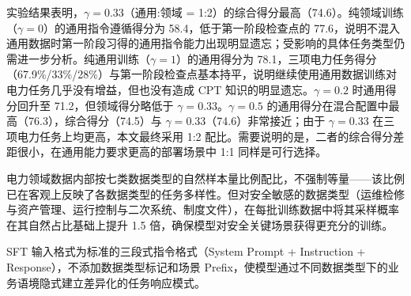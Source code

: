 \documentclass[fontset=fandol,type=master,campus=shenzhen,etitleauto=true]{hithesisbook}
\begin{document}
\begin{table}[htbp]
\centering
\caption{SFT第二阶段通用-领域数据配比实验结果}
\label{tab:sft-ratio}
\small
\setlength{\tabcolsep}{4pt}
\end{table}

实验结果表明，$\gamma = 0.33$（通用:领域 = 1:2）的综合得分最高（74.6）。纯领域训练（$\gamma = 0$）的通用指令遵循得分为 58.4，低于第一阶段检查点的 77.6，说明不混入通用数据时第一阶段习得的通用指令能力出现明显遗忘；受影响的具体任务类型仍需进一步分析。纯通用训练（$\gamma = 1$）的通用得分为 78.1，三项电力任务得分（67.9\%/33\%/28\%）与第一阶段检查点基本持平，说明继续使用通用数据训练对电力任务几乎没有增益，但也没有造成 CPT 知识的明显遗忘。$\gamma = 0.2$ 时通用得分回升至 71.2，但领域得分略低于 $\gamma = 0.33$。$\gamma = 0.5$ 的通用得分在混合配置中最高（76.3），综合得分（74.5）与 $\gamma = 0.33$（74.6）非常接近；由于 $\gamma = 0.33$ 在三项电力任务上均更高，本文最终采用 1:2 配比。需要说明的是，二者的综合得分差距很小，在通用能力要求更高的部署场景中 1:1 同样是可行选择。

电力领域数据内部按七类数据类型的自然样本量比例配比，不强制等量------该比例已在客观上反映了各数据类型的任务多样性。但对安全敏感的数据类型（运维检修与资产管理、运行控制与二次系统、制度文件），在每批训练数据中将其采样概率在其自然占比基础上提升 1.5 倍，确保模型对安全关键场景获得更充分的训练。

SFT 输入格式为标准的三段式指令格式（System Prompt + Instruction + Response），不添加数据类型标记和场景 Prefix，使模型通过不同数据类型下的业务语境隐式建立差异化的任务响应模式。
\end{document}
